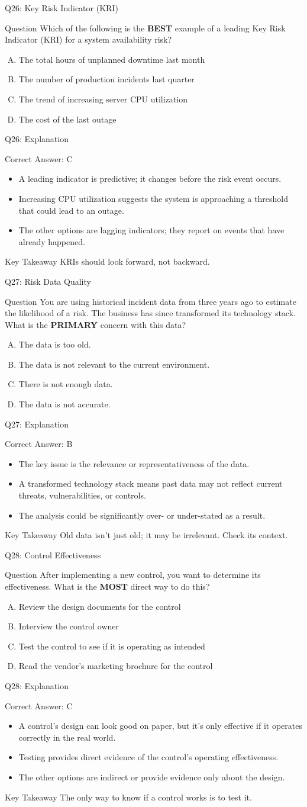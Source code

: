 \documentclass[aspectratio=169]{beamer}
\newcommand{\hq}[7]{%
	\begin{frame}{Q#1: #2}
		\begin{block}{Question}
			#3
		\end{block}
		\begin{enumerate}[(A)]
			#4
		\end{enumerate}
	\end{frame}
	\begin{frame}{Q#1: Explanation}
		\begin{block}{Correct Answer: #5}
			\begin{itemize}
				#6
			\end{itemize}
		\end{block}
		\begin{alertblock}{Key Takeaway}
			#7
		\end{alertblock}
	\end{frame}
}
\begin{document}
	\hq{26}{Key Risk Indicator (KRI)}
	{Which of the following is the \textbf{BEST} example of a leading Key Risk Indicator (KRI) for a system availability risk?}
	{\item The total hours of unplanned downtime last month
		\item The number of production incidents last quarter
		\item The trend of increasing server CPU utilization
		\item The cost of the last outage}
	{C}
	{\item A leading indicator is predictive; it changes before the risk event occurs.
		\item Increasing CPU utilization suggests the system is approaching a threshold that could lead to an outage.
		\item The other options are lagging indicators; they report on events that have already happened.}
	{KRIs should look forward, not backward.}
	
	\hq{27}{Risk Data Quality}
	{You are using historical incident data from three years ago to estimate the likelihood of a risk. The business has since transformed its technology stack. What is the \textbf{PRIMARY} concern with this data?}
	{\item The data is too old.
		\item The data is not relevant to the current environment.
		\item There is not enough data.
		\item The data is not accurate.}
	{B}
	{\item The key issue is the relevance or representativeness of the data.
		\item A transformed technology stack means past data may not reflect current threats, vulnerabilities, or controls.
		\item The analysis could be significantly over- or under-stated as a result.}
	{Old data isn't just old; it may be irrelevant. Check its context.}
	
	\hq{28}{Control Effectiveness}
	{After implementing a new control, you want to determine its effectiveness. What is the \textbf{MOST} direct way to do this?}
	{\item Review the design documents for the control
		\item Interview the control owner
		\item Test the control to see if it is operating as intended
		\item Read the vendor's marketing brochure for the control}
	{C}
	{\item A control's design can look good on paper, but it's only effective if it operates correctly in the real world.
		\item Testing provides direct evidence of the control's operating effectiveness.
		\item The other options are indirect or provide evidence only about the design.}
	{The only way to know if a control works is to test it.}
	
\end{document}
